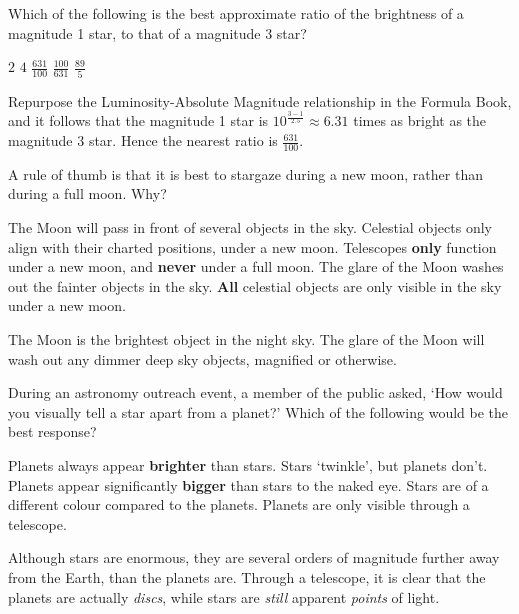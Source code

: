 \documentclass[a4paper,11pt]{exam}
\begin{document}
\begin{questions}
\question
	Which of the following is the best approximate ratio of the brightness of a magnitude 1 star, to that of a magnitude 3 star?

	\begin{oneparchoices}
		\choice $ 2 $
		\choice $ 4 $
		\correctchoice $\displaystyle \frac{631}{100} $
		\choice $\displaystyle \frac{100}{631} $
		\choice $\displaystyle \frac{89}{5} $
	\end{oneparchoices}
	\begin{solution}
		Repurpose the Luminosity-Absolute Magnitude relationship in the Formula Book, and it follows that the magnitude 1 star is $ 10^{\frac{3-1}{2.5}} \approx 6.31 $ times as bright as the magnitude 3 star. Hence the nearest ratio is $  \frac{631}{100}$.
	\end{solution}

\filbreak
\question
	A rule of thumb is that it is best to stargaze during a new moon, rather than during a full moon. Why?
	\begin{choices}
		\choice The Moon will pass in front of several objects in the sky.
		\choice Celestial objects only align with their charted positions, under a new moon.
		\choice Telescopes \textbf{only} function under a new moon, and \textbf{never} under a full moon.
		\correctchoice The glare of the Moon washes out the fainter objects in the sky.
		\choice \textbf{All} celestial objects are only visible in the sky under a new moon.
	\end{choices}
	\begin{solution}
		The Moon is the brightest object in the night sky. The glare of the Moon will wash out any dimmer deep sky objects, magnified or otherwise.
	\end{solution}

\filbreak
\question
	During an astronomy outreach event, a member of the public asked, `How would you visually tell a star apart from a planet?' Which of the following would be the best response?
	\begin{choices}
		\choice Planets always appear \textbf{brighter} than stars.
		\correctchoice Stars `twinkle', but planets don't.
		\choice Planets appear significantly \textbf{bigger} than stars to the naked eye.
		\choice Stars are of a different colour compared to the planets.
		\choice Planets are only visible through a telescope.
	\end{choices}
	\begin{solution}
		Although stars are enormous, they are several orders of magnitude further away from the Earth, than the planets are. Through a telescope, it is clear that the planets are actually \textit{discs}, while stars are \textit{still} apparent \textit{points} of light.


\end{solution}
\end{questions}
\end{document}
